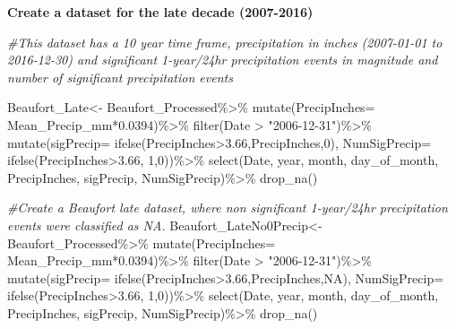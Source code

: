 \documentclass[
  12pt,
]{article}
\newenvironment{Shaded}{\begin{snugshade}}{\end{snugshade}}
\newcommand{\AttributeTok}[1]{\textcolor[rgb]{0.77,0.63,0.00}{#1}}
\newcommand{\CommentTok}[1]{\textcolor[rgb]{0.56,0.35,0.01}{\textit{#1}}}
\newcommand{\ConstantTok}[1]{\textcolor[rgb]{0.00,0.00,0.00}{#1}}
\newcommand{\DecValTok}[1]{\textcolor[rgb]{0.00,0.00,0.81}{#1}}
\newcommand{\FloatTok}[1]{\textcolor[rgb]{0.00,0.00,0.81}{#1}}
\newcommand{\FunctionTok}[1]{\textcolor[rgb]{0.00,0.00,0.00}{#1}}
\newcommand{\NormalTok}[1]{#1}
\newcommand{\OtherTok}[1]{\textcolor[rgb]{0.56,0.35,0.01}{#1}}
\newcommand{\SpecialCharTok}[1]{\textcolor[rgb]{0.00,0.00,0.00}{#1}}
\newcommand{\StringTok}[1]{\textcolor[rgb]{0.31,0.60,0.02}{#1}}
\begin{document}
\textbf{Create a dataset for the late decade (2007-2016)}

\begin{Shaded}
\begin{Highlighting}[]
\CommentTok{\#This dataset has a 10 year time frame, precipitation in inches (2007{-}01{-}01 to 2016{-}12{-}30) and significant 1{-}year/24hr precipitation events in magnitude and number of significant precipitation events}

\NormalTok{Beaufort\_Late}\OtherTok{\textless{}{-}}\NormalTok{ Beaufort\_Processed}\SpecialCharTok{\%\textgreater{}\%}
  \FunctionTok{mutate}\NormalTok{(}\AttributeTok{PrecipInches=}\NormalTok{ Mean\_Precip\_mm}\SpecialCharTok{*}\FloatTok{0.0394}\NormalTok{)}\SpecialCharTok{\%\textgreater{}\%}
  \FunctionTok{filter}\NormalTok{(Date }\SpecialCharTok{\textgreater{}} \StringTok{"2006{-}12{-}31"}\NormalTok{)}\SpecialCharTok{\%\textgreater{}\%}
  \FunctionTok{mutate}\NormalTok{(}\AttributeTok{sigPrecip=} \FunctionTok{ifelse}\NormalTok{(PrecipInches}\SpecialCharTok{\textgreater{}}\FloatTok{3.66}\NormalTok{,PrecipInches,}\DecValTok{0}\NormalTok{),}
         \AttributeTok{NumSigPrecip=} \FunctionTok{ifelse}\NormalTok{(PrecipInches}\SpecialCharTok{\textgreater{}}\FloatTok{3.66}\NormalTok{, }\DecValTok{1}\NormalTok{,}\DecValTok{0}\NormalTok{))}\SpecialCharTok{\%\textgreater{}\%}
  \FunctionTok{select}\NormalTok{(Date, year, month, }
\NormalTok{         day\_of\_month, PrecipInches, sigPrecip, NumSigPrecip)}\SpecialCharTok{\%\textgreater{}\%}
  \FunctionTok{drop\_na}\NormalTok{()}

\CommentTok{\#Create a Beaufort late dataset, where non significant 1{-}year/24hr precipitation events were classified as NA.}
\NormalTok{Beaufort\_LateNo0Precip}\OtherTok{\textless{}{-}}\NormalTok{ Beaufort\_Processed}\SpecialCharTok{\%\textgreater{}\%}
  \FunctionTok{mutate}\NormalTok{(}\AttributeTok{PrecipInches=}\NormalTok{ Mean\_Precip\_mm}\SpecialCharTok{*}\FloatTok{0.0394}\NormalTok{)}\SpecialCharTok{\%\textgreater{}\%}
  \FunctionTok{filter}\NormalTok{(Date }\SpecialCharTok{\textgreater{}} \StringTok{"2006{-}12{-}31"}\NormalTok{)}\SpecialCharTok{\%\textgreater{}\%}
  \FunctionTok{mutate}\NormalTok{(}\AttributeTok{sigPrecip=} \FunctionTok{ifelse}\NormalTok{(PrecipInches}\SpecialCharTok{\textgreater{}}\FloatTok{3.66}\NormalTok{,PrecipInches,}\ConstantTok{NA}\NormalTok{),}
         \AttributeTok{NumSigPrecip=} \FunctionTok{ifelse}\NormalTok{(PrecipInches}\SpecialCharTok{\textgreater{}}\FloatTok{3.66}\NormalTok{, }\DecValTok{1}\NormalTok{,}\DecValTok{0}\NormalTok{))}\SpecialCharTok{\%\textgreater{}\%}
  \FunctionTok{select}\NormalTok{(Date, year, month, }
\NormalTok{         day\_of\_month, PrecipInches, sigPrecip, NumSigPrecip)}\SpecialCharTok{\%\textgreater{}\%}
  \FunctionTok{drop\_na}\NormalTok{()}


\end{Highlighting}
\end{Shaded}
\end{document}
